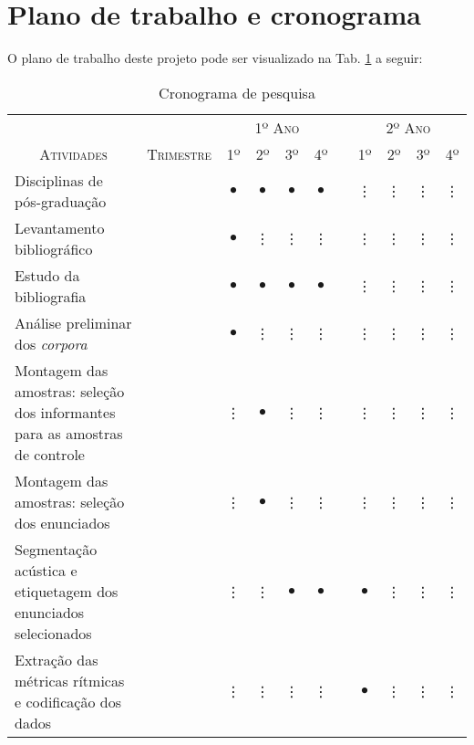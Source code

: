 \documentclass[
		a4paper,	%
		12pt,		%
		]{article}	%
\begin{document}
	\section{Plano de trabalho e cronograma} \label{plano}

	O plano de trabalho deste projeto pode ser visualizado na Tab.
	\ref{tab-crono} a seguir:

	\begin{table}[h!]
		\vspace{1em}
		\caption{\rmfamily Cronograma de pesquisa}
		\vspace{.5em}
		\label{tab-crono}
		\begin{tabular}{m{.44\linewidth}cccccccccc}
			&& \multicolumn{4}{c}{\scshape\normalsize 1º Ano} &&
			\multicolumn{4}{c}{\scshape\normalsize 2º Ano} \\
			\cline{3-6}\cline{8-11}
			\multicolumn{1}{c}{\scshape\normalsize Atividades}&
			\scshape\normalsize Trimestre &\scshape\normalsize  1º
			&\scshape\normalsize  2º &\scshape\normalsize  3º
			&\scshape\normalsize  4º &\scshape\normalsize  &\scshape\normalsize
			1º &\scshape\normalsize  2º &\scshape\normalsize  3º &\scshape\normalsize  4º \\
			\hline
			\hline
			Disciplinas de pós-graduação
			&&$\bullet$&$\bullet$&$\bullet$&$\bullet$ &&\vdots&\vdots&\vdots &\vdots \\  
			\rowcolor{cinza1}
			Levantamento bibliográfico
			&&$\bullet$&\vdots&\vdots&\vdots&&\vdots&\vdots&\vdots&\vdots \\  
			Estudo da bibliografia &&$\bullet$&$\bullet$&$\bullet$&$\bullet$&&\vdots&\vdots&\vdots &\vdots \\  
			\rowcolor{cinza1}
			Análise preliminar dos \emph{corpora}
			&&$\bullet$&\vdots&\vdots&\vdots&&\vdots&\vdots&\vdots &\vdots \\  
			Montagem das amostras: seleção dos informantes para as amostras de
			controle &&\vdots&$\bullet$&\vdots&\vdots&&\vdots&\vdots&\vdots &\vdots \\  
			\rowcolor{cinza1}
			Montagem das amostras: seleção dos enunciados &&\vdots&$\bullet$&\vdots&\vdots&&\vdots&\vdots&\vdots &\vdots \\  
			Segmentação acústica e etiquetagem dos enunciados selecionados
			&&\vdots&\vdots&$\bullet$&$\bullet$&&$\bullet$&\vdots&\vdots &\vdots \\  	
			\rowcolor{cinza1}
			Extração das métricas rítmicas e codificação dos dados &&\vdots&\vdots&\vdots&\vdots&&$\bullet$&\vdots&\vdots &\vdots \\  

\end{tabular}
\end{table}
\end{document}
